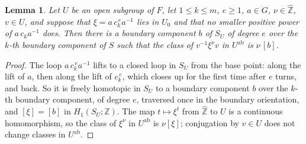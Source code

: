 \documentclass[11pt]{amsart}
\newtheorem{lemma}[thm]{Lemma}
\theoremstyle{definition}
\theoremstyle{remark}
\newcommand{\Z}{\mathbb Z}
\newcommand{\Zh}{\widehat{\mathbb Z}}
\newcommand{\ab}{\mathrm{ab}}
\begin{document}
\begin{lemma}\label{lem:lift}
Let $U$ be an open subgroup of $F$, let $1\le k\le m$, $e\ge1$, $a\in G$, $\nu\in\Zh$, $v\in U$, and suppose that $\xi=a\,c_k^{\,e}a^{-1}$ lies in $U_0$ and that no smaller positive power of $a\,c_ka^{-1}$ does. Then there is a boundary component $b$ of $S_U$ of degree $e$ over the $k$-th boundary component of $S$ such that the class of $v^{-1}\xi^{\nu}v$ in $U^{\ab}$ is $\nu\,[b]$.
\end{lemma}

\begin{proof}
The loop $a\,c_k^{\,e}a^{-1}$ lifts to a closed loop in $S_U$ from the base point: along the lift of $a$, then along the lift of $c_k^{\,e}$, which closes up for the first time after $e$ turns, and back. So it is freely homotopic in $S_U$ to a boundary component $b$ over the $k$-th boundary component, of degree $e$, traversed once in the boundary orientation, and $[\xi]=[b]$ in $H_1(S_U;\Z)$. The map $t\mapsto\xi^t$ from $\Zh$ to $U$ is a continuous homomorphism, so the class of $\xi^\nu$ in $U^{\ab}$ is $\nu[\xi]$; conjugation by $v\in U$ does not change classes in $U^{\ab}$.
\end{proof}
\end{document}
